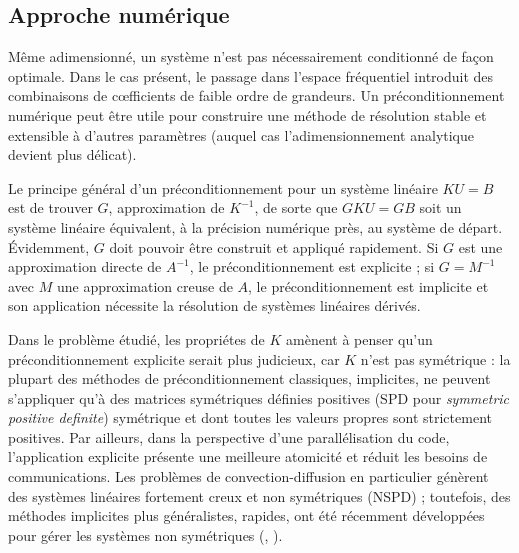 \subsection{Approche numérique}

Même adimensionné, un système n'est pas nécessairement conditionné de façon optimale. Dans le cas présent, le passage dans l'espace fréquentiel introduit des combinaisons de cœfficients de faible ordre de grandeurs. Un préconditionnement numérique peut être utile pour construire une méthode de résolution stable et extensible à d'autres paramètres (auquel cas l'adimensionnement analytique devient plus délicat).

Le principe général d'un préconditionnement pour un système linéaire $KU = B$ est de trouver $G$, approximation de $K^{-1}$, de sorte que $GKU = GB$ soit un système linéaire équivalent, à la précision numérique près, au système de départ. Évidemment, $G$ doit pouvoir être construit et appliqué rapidement. Si $G$ est une approximation directe de $A^{-1}$, le préconditionnement est explicite ; si $G = M^{-1}$ avec $M$ une approximation creuse de $A$, le préconditionnement est implicite et son application nécessite la résolution de systèmes linéaires dérivés.

Dans le problème étudié, les propriétes de $K$ amènent à penser qu'un préconditionnement explicite serait plus judicieux, car $K$ n'est pas symétrique : la plupart des méthodes de préconditionnement classiques, implicites, ne peuvent s'appliquer qu'à des matrices symétriques définies positives (SPD pour \emph{symmetric positive definite}) \ie symétrique et dont toutes les valeurs propres sont strictement positives. Par ailleurs, dans la perspective d'une parallélisation du code, l'application explicite présente une meilleure atomicité et réduit les besoins de communications. Les problèmes de convection-diffusion en particulier génèrent des systèmes linéaires fortement creux et non symétriques (NSPD) ; toutefois, des méthodes implicites plus généralistes, rapides, ont été récemment développées pour gérer les systèmes non symétriques (\cite{Rezghi2006}, \cite{Benzi1998}).

